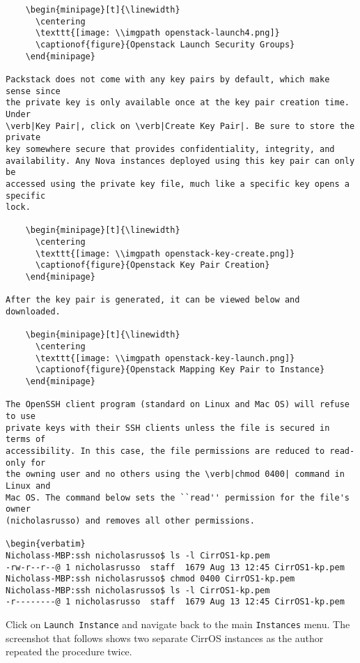 \begin{verbatim}
    \begin{minipage}[t]{\linewidth}
	  \centering
      \texttt{[image: \\imgpath openstack-launch4.png]}
      \captionof{figure}{Openstack Launch Security Groups}
    \end{minipage}

Packstack does not come with any key pairs by default, which make sense since
the private key is only available once at the key pair creation time. Under
\verb|Key Pair|, click on \verb|Create Key Pair|. Be sure to store the private
key somewhere secure that provides confidentiality, integrity, and
availability. Any Nova instances deployed using this key pair can only be
accessed using the private key file, much like a specific key opens a specific
lock.

    \begin{minipage}[t]{\linewidth}
	  \centering
      \texttt{[image: \\imgpath openstack-key-create.png]}
      \captionof{figure}{Openstack Key Pair Creation}
    \end{minipage}

After the key pair is generated, it can be viewed below and downloaded.

    \begin{minipage}[t]{\linewidth}
	  \centering
      \texttt{[image: \\imgpath openstack-key-launch.png]}
      \captionof{figure}{Openstack Mapping Key Pair to Instance}
    \end{minipage}

The OpenSSH client program (standard on Linux and Mac OS) will refuse to use
private keys with their SSH clients unless the file is secured in terms of
accessibility. In this case, the file permissions are reduced to read-only for
the owning user and no others using the \verb|chmod 0400| command in Linux and
Mac OS. The command below sets the ``read'' permission for the file's owner
(nicholasrusso) and removes all other permissions.

\begin{verbatim}
Nicholass-MBP:ssh nicholasrusso$ ls -l CirrOS1-kp.pem
-rw-r--r--@ 1 nicholasrusso  staff  1679 Aug 13 12:45 CirrOS1-kp.pem
Nicholass-MBP:ssh nicholasrusso$ chmod 0400 CirrOS1-kp.pem
Nicholass-MBP:ssh nicholasrusso$ ls -l CirrOS1-kp.pem
-r--------@ 1 nicholasrusso  staff  1679 Aug 13 12:45 CirrOS1-kp.pem
\end{verbatim}

Click on \verb|Launch Instance| and navigate back to the main \verb|Instances|
menu. The screenshot that follows shows two separate CirrOS instances
as the author repeated the procedure twice.

